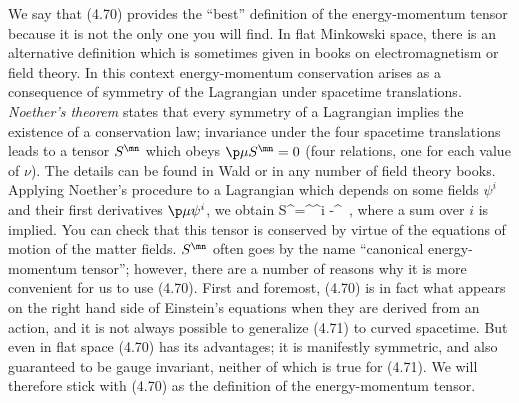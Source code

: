 \documentclass[12pt]{article}
\begin{document}
We say that (4.70) provides the ``best'' definition of the energy-momentum
tensor because it is not the only one you will find.  In flat Minkowski 
space, there is an alternative definition which is sometimes given in books
on electromagnetism or field theory.  In this context energy-momentum
conservation arises as a consequence of symmetry of the Lagrangian
under spacetime translations.  {\it Noether's theorem}
states that every symmetry of a Lagrangian implies the existence
of a conservation law; invariance under the four spacetime translations 
leads to a tensor $S^\mn$ which obeys $\p\mu S^\mn=0$ (four relations,
one for each value of $\nu$).  The details can be found in Wald or
in any number of field theory books.  Applying Noether's procedure
to a Lagrangian which depends on some fields $\psi^i$ and their
first derivatives $\p\mu\psi^i$, we obtain
\be
  S^\mn={{}}\partial^\nu\psi^i
  -\eta^\ ,\label{4.71}
\ee
where a sum over $i$ is implied.  You can check that this tensor
is conserved by virtue of the equations of motion of the matter
fields.  $S^\mn$ often goes by the name ``canonical
energy-momentum tensor''; however, there are a number of reasons
why it is more convenient for us to use (4.70).  First and foremost,
(4.70) is in fact what appears on the right hand side of 
Einstein's equations when they are derived from an action, and it
is not always possible to generalize (4.71) to curved spacetime.  
But even in flat space (4.70) has its advantages; it is
manifestly symmetric, and also guaranteed to be gauge invariant,
neither of which is true for (4.71).  We will therefore stick with
(4.70) as the definition of the energy-momentum tensor.
\end{document}
